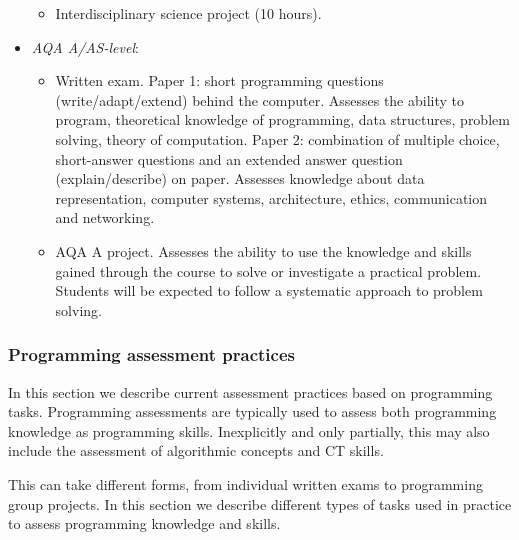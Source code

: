 \begin{itemize}
\begin{itemize}
    \item Interdisciplinary science project (10 hours).
    \end{itemize}



\item \emph{AQA A/AS-level}:
    \begin{itemize}
    \item Written exam. Paper 1: short programming questions (write/adapt/extend) behind the computer. Assesses the ability to program, theoretical knowledge of programming, data structures, problem solving, theory of computation. Paper 2: combination of multiple choice, short-answer questions and an extended answer question (explain/describe) on paper. Assesses knowledge about data representation, computer systems, architecture, ethics, communication and networking.
    \item AQA A project. Assesses the ability to use the knowledge and skills gained through the course to solve or investigate a practical problem. Students will be expected to follow a systematic approach to problem solving.

    \end{itemize}

\end{itemize}


\subsubsection{Programming assessment practices}\label{sec:progAssessPractices}

In this section we describe current assessment practices based on programming tasks. Programming assessments are typically used to assess both programming knowledge as programming skills. Inexplicitly and only partially, this may also include the assessment of algorithmic concepts and CT skills.


This can take different forms, from individual written exams to programming group projects. In this section we describe different types of tasks used in practice to assess programming knowledge and skills.


